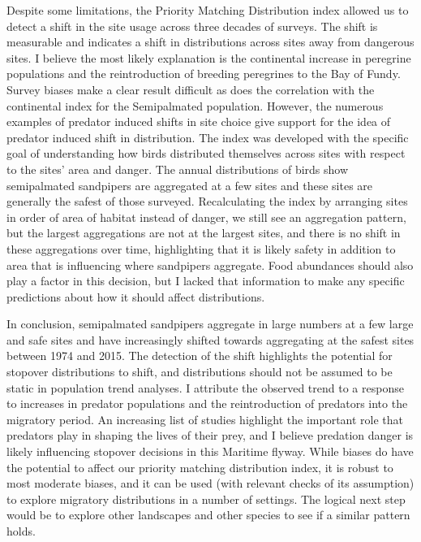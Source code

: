 Despite some limitations, the Priority Matching Distribution index allowed us to detect a shift in the site usage across three decades of surveys. The shift is measurable and indicates a shift in distributions across sites away from dangerous sites. I believe the most likely explanation is the continental increase in peregrine populations and the reintroduction of breeding peregrines to the Bay of Fundy. Survey biases make a clear result difficult as does the correlation with the continental index for the Semipalmated population. However, the numerous examples of predator induced shifts in site choice give support for the idea of predator induced shift in distribution. The index was developed with the specific goal of understanding how birds distributed themselves across sites with respect to the sites' area and danger. The annual distributions of birds show semipalmated sandpipers are aggregated at a few sites and these sites are generally the safest of those surveyed. Recalculating the index by arranging sites in order of area of habitat instead of danger, we still see an aggregation pattern, but the largest aggregations are not at the largest sites, and there is no shift in these aggregations over time, highlighting that it is likely safety in addition to area that is influencing where sandpipers aggregate. Food abundances should also play a factor in this decision, but I lacked that information to make any specific predictions about how it should affect distributions.

In conclusion, semipalmated sandpipers aggregate in large numbers at a few large and safe sites and have increasingly shifted towards aggregating at the safest sites between 1974 and 2015. The detection of the shift highlights the potential for stopover distributions to shift, and distributions should not be assumed to be static in population trend analyses. I attribute the observed trend to a response to increases in predator populations and the reintroduction of predators into the migratory period. An increasing list of studies highlight the important role that predators play in shaping the lives of their prey, and I believe predation danger is likely influencing stopover decisions in this Maritime flyway. While biases do have the potential to affect our priority matching distribution index, it is robust to most moderate biases, and it can be used (with relevant checks of its assumption) to explore migratory distributions in a number of settings. The logical next step would be to explore other landscapes and other species to see if a similar pattern holds.